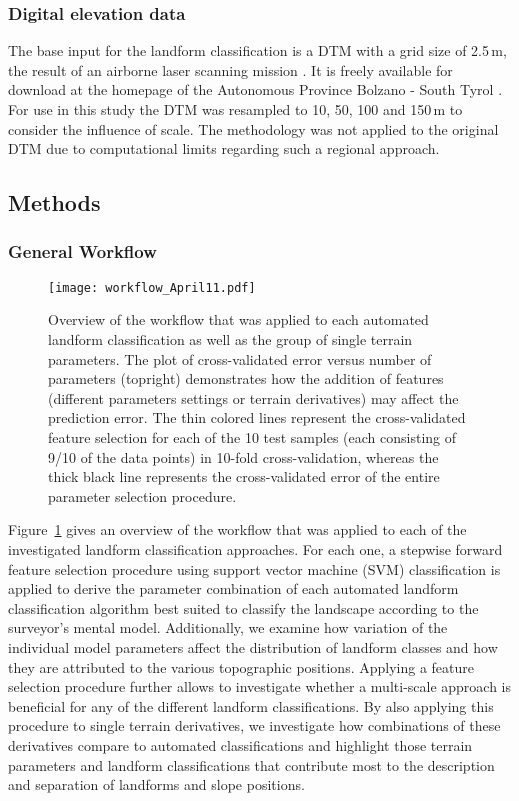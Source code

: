 \documentclass[preprint,12pt,authoryear]{elsarticle}
\begin{document}
\subsubsection{Digital elevation data}
The base input for the landform classification is a DTM with a grid size of 2.5\,m, the result of an airborne laser scanning mission \citep{Wack2005}. It is freely available for download at the homepage of the Autonomous Province Bolzano - South Tyrol \citep{DTM}. For use in this study the DTM was resampled to 10, 50, 100 and 150\,m to consider the influence of scale. The methodology was not applied to the original DTM due to computational limits regarding such a regional approach.
\subsection{Methods}
\subsubsection{General Workflow}
\begin{figure}
\texttt{[image: workflow\_April11.pdf]}
\caption{Overview of the workflow that was applied to each automated landform classification as well as the group of single terrain parameters. The plot of cross-validated error versus number of parameters (topright) demonstrates how the addition of features (different parameters settings or terrain derivatives) may affect the prediction error. The thin colored lines represent the cross-validated feature selection for each of the 10 test samples (each consisting of 9/10 of the data points) in 10-fold cross-validation, whereas the thick black line represents the cross-validated error of the entire parameter selection procedure.}
\label{fig:workflow}
\end{figure}
Figure~\ref{fig:workflow} gives an overview of the workflow that was applied to each of the investigated landform classification approaches. For each one, a stepwise forward feature selection procedure using support vector machine (SVM) classification is applied to derive the parameter combination of each automated landform classification algorithm best suited to classify the landscape according to the surveyor's mental model. Additionally, we examine how variation of the individual model parameters affect the distribution of landform classes and how they are attributed to the various topographic positions. Applying a feature selection procedure further allows to investigate whether a multi-scale approach is beneficial for any of the different landform classifications. By also applying this procedure to single terrain derivatives, we investigate how combinations of these derivatives compare to automated classifications and highlight those terrain parameters and landform classifications that contribute most to the description and separation of landforms and slope positions.
\end{document}
